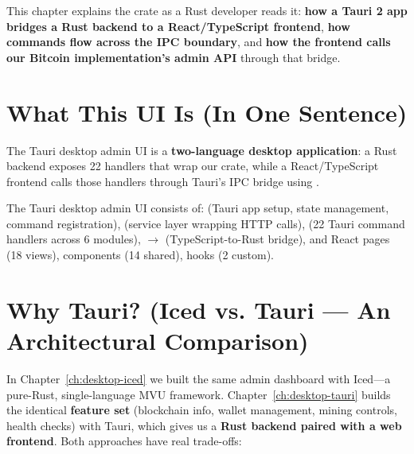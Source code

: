 This chapter explains the  crate as a Rust developer reads it: \textbf{how a Tauri 2 app bridges a Rust backend to a React/TypeScript frontend}, \textbf{how commands flow across the IPC boundary}, and \textbf{how the frontend calls our Bitcoin implementation's admin API} through that bridge.

\section{What This UI Is (In One Sentence)}
\label{sec:ch17-oneline}

The Tauri desktop admin UI is a \textbf{two-language desktop application}: a Rust backend exposes 22  handlers that wrap our  crate, while a React/TypeScript frontend calls those handlers through Tauri's IPC bridge using .

The Tauri desktop admin UI consists of:  (Tauri app setup, state management, command registration),  (service layer wrapping  HTTP calls),  (22 Tauri command handlers across 6 modules),  \(\to\)  (TypeScript-to-Rust bridge), and React pages (18 views), components (14 shared), hooks (2 custom).

\section{Why Tauri? (Iced vs. Tauri --- An Architectural Comparison)}
\label{sec:ch17-comparison}

In Chapter~\ref{ch:desktop-iced} we built the same admin dashboard with Iced---a pure-Rust, single-language MVU framework. Chapter~\ref{ch:desktop-tauri} builds the identical \textbf{feature set} (blockchain info, wallet management, mining controls, health checks) with Tauri, which gives us a \textbf{Rust backend paired with a web frontend}. Both approaches have real trade-offs:

